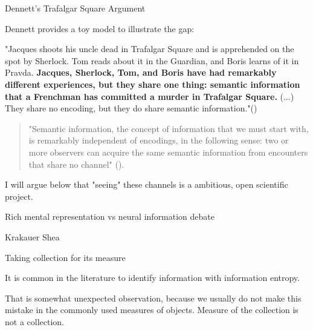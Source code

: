 \documentclass[10pt, aspectratio=169, handout]{beamer}
\begin{document}
\begin{frame}[label=trafalgar]{Dennett's Trafalgar Square Argument}
    
    Dennett provides a toy model to illustrate the gap: 
    
    "Jacques shoots his uncle dead in Trafalgar Square and is apprehended on the spot by Sherlock. Tom reads about it in the Guardian, and Boris learns of it in Pravda.\textbf{ Jacques, Sherlock, Tom, and Boris have had remarkably different experiences, but they share one thing: semantic information that a Frenchman has committed a murder in Trafalgar Square.} (...) They share no encoding, but they do share semantic information."(\cite{dennett_bacteria_2017})

    \bigskip
    
    \begin{quote}
    "Semantic information, the concept of information that we must start with, is remarkably independent of encodings, in the following sense: two or more observers can acquire the same semantic information from encounters that share no channel" (\cite{dennett_bacteria_2017}). 
    \end{quote}

    I will argue below that "seeing" these channels is a ambitious, open scientific project.

\end{frame}

\begin{frame}[label=rich_mental_representation]{Rich mental representation vs neural information debate}

    Krakauer Shea 

\end{frame}



\begin{frame}{Taking collection for its measure }

    
    It is common in the literature to identify information with information entropy.
  
    That is somewhat unexpected observation, because we usually do not make this mistake in the commonly used measures of objects. Measure of the collection is not a collection.

    
\end{frame}
\end{document}
